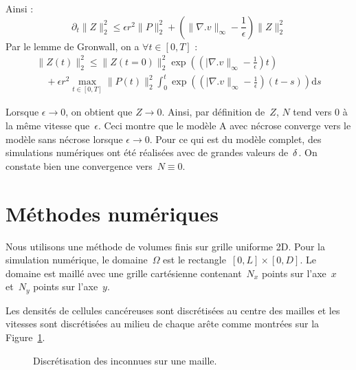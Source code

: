 \documentclass[main.tex]{subfiles}
\begin{document}
Ainsi :
\begin{equation}
\partial_t \|Z\|_2^2 \leq \epsilon r^2 \|P\|_2^2 + \left( \|\nabla.v\|_\infty - \frac{1}{\epsilon} \right) \| Z \|^2_2
\end{equation}
Par le lemme de Gronwall, on a $\forall t\in [0,T]$ :
\begin{equation}
\begin{array}{l}
\displaystyle \|Z(t)\|^2_2 \leq \|Z(t=0)\|_2^2 \exp \left(  \left(  |\nabla.v\|_\infty - \frac{1}{\epsilon} \right) t\right) \\
\displaystyle \quad + \epsilon r^2 \max_{t\in[0,T]} \| P(t) \|^2_2 \int_0^t \exp \left(  \left(  |\nabla.v\|_\infty - \frac{1}{\epsilon} \right) (t-s) \right) \textrm{d}s
\end{array}
\end{equation}

Lorsque $\epsilon \to 0$, on obtient que $Z \to 0$. Ainsi, par définition de~$Z$, $N$ tend vers 0 à la même vitesse que~$\epsilon$. Ceci montre que le modèle A avec nécrose converge vers le modèle sans nécrose lorsque $\epsilon \to 0$. 
Pour ce qui est du modèle complet, des simulations numériques ont été réalisées avec de grandes valeurs de~$\delta$. On constate bien une convergence vers~$N\equiv0$.


\section{Méthodes numériques}\label{sec:NumMet}

Nous utilisons une méthode de volumes finis sur grille uniforme 2D. Pour la simulation numérique, le domaine~$\Omega$ est le 
rectangle~$[0,L]\times[0,D]$. Le domaine est maillé avec une grille cartésienne contenant~$N_x$ points sur l'axe~$x$ et~$N_y$ points sur l'axe~$y$.

Les densités de cellules cancéreuses sont discrétisées au centre des mailles et les vitesses sont discrétisées au milieu de chaque arête comme montrées sur la Figure~\ref{fig:place_inconnues}.

\begin{figure}[h]
\centering

\caption{Discrétisation des inconnues sur une maille.\label{fig:place_inconnues}}
\end{figure}
\end{document}
